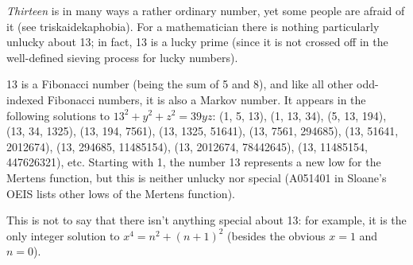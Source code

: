 \documentclass[12pt]{article}
\begin{document}
{\em Thirteen} is in many ways a rather ordinary number, yet some people are afraid of it (see triskaidekaphobia). For a mathematician there is nothing particularly unlucky about 13; in fact, 13 is a lucky prime (since it is not crossed off in the well-defined sieving process for lucky numbers).

13 is a Fibonacci number (being the sum of 5 and 8), and like all other odd-indexed Fibonacci numbers, it is also a Markov number. It appears in the following solutions to $13^2 + y^2 + z^2 = 39yz$: (1, 5, 13), (1, 13, 34), (5, 13, 194), (13, 34, 1325), (13, 194, 7561), (13, 1325, 51641), (13, 7561, 294685), (13, 51641, 2012674), (13, 294685, 11485154), (13, 2012674, 78442645), (13, 11485154, 447626321), etc. Starting with 1, the number 13 represents a new low for the Mertens function, but this is neither unlucky nor special (A051401 in Sloane's OEIS lists other lows of the Mertens function).

This is not to say that there isn't anything special about 13: for example, it is the only integer solution to $x^4 = n^2 + (n + 1)^2$ (besides the obvious $x = 1$ and $n = 0$).

\end{document}
